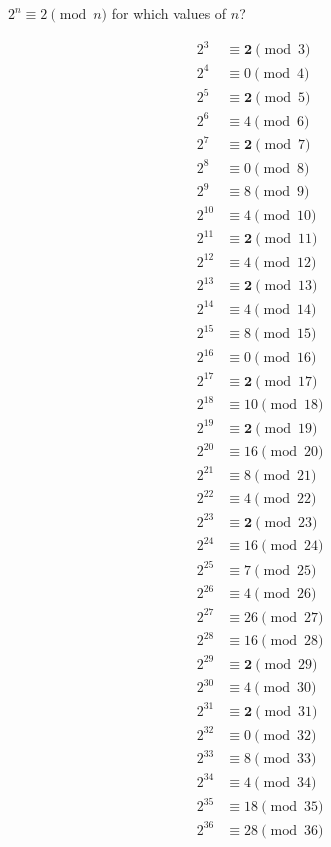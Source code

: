 \documentclass[12pt]{handout}
\begin{document}
$2^n \equiv 2 \pmod n$ for which values of $n$?

\begin{multicols}{3}
\begin{align*}
2^{3} &\equiv \mathbf{2} \pmod{3} \\
2^{4} &\equiv 0 \pmod{4} \\
2^{5} &\equiv \mathbf{2} \pmod{5} \\
2^{6} &\equiv 4 \pmod{6} \\
2^{7} &\equiv \mathbf{2} \pmod{7} \\
2^{8} &\equiv 0 \pmod{8} \\
2^{9} &\equiv 8 \pmod{9} \\
2^{10} &\equiv 4 \pmod{10} \\
2^{11} &\equiv \mathbf{2} \pmod{11} \\
2^{12} &\equiv 4 \pmod{12} \\
2^{13} &\equiv \mathbf{2} \pmod{13} \\
2^{14} &\equiv 4 \pmod{14} \\
2^{15} &\equiv 8 \pmod{15} \\
2^{16} &\equiv 0 \pmod{16} \\
2^{17} &\equiv \mathbf{2} \pmod{17} \\
2^{18} &\equiv 10 \pmod{18} \\
2^{19} &\equiv \mathbf{2} \pmod{19} \\
2^{20} &\equiv 16 \pmod{20} \\
2^{21} &\equiv 8 \pmod{21} \\
2^{22} &\equiv 4 \pmod{22} \\
2^{23} &\equiv \mathbf{2} \pmod{23} \\
2^{24} &\equiv 16 \pmod{24} \\
2^{25} &\equiv 7 \pmod{25} \\
2^{26} &\equiv 4 \pmod{26} \\
2^{27} &\equiv 26 \pmod{27} \\
2^{28} &\equiv 16 \pmod{28} \\
2^{29} &\equiv \mathbf{2} \pmod{29} \\
2^{30} &\equiv 4 \pmod{30} \\
2^{31} &\equiv \mathbf{2} \pmod{31} \\
2^{32} &\equiv 0 \pmod{32} \\
2^{33} &\equiv 8 \pmod{33} \\
2^{34} &\equiv 4 \pmod{34} \\
2^{35} &\equiv 18 \pmod{35} \\
2^{36} &\equiv 28 \pmod{36}

\end{align*}
\end{multicols}
\end{document}
